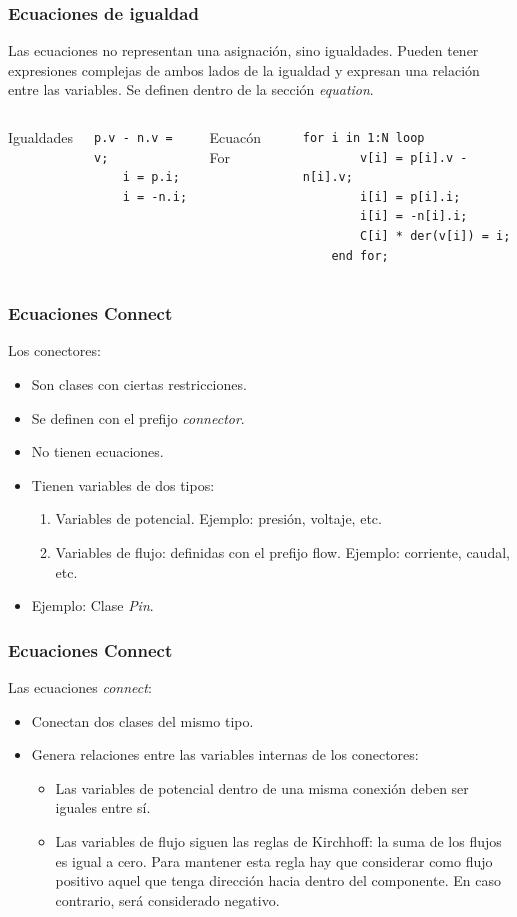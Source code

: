 \documentclass[aspectratio=169,10pt]{beamer}
\begin{document}
\begin{frame}[fragile]
\frametitle{Ecuaciones de igualdad} 

Las ecuaciones no representan una asignaci\'on, sino igualdades. Pueden tener expresiones complejas de ambos lados de la igualdad y expresan una relaci\'on entre las variables. Se definen dentro de la secci\'on \textit{equation}.

\begin{columns}  
\column[t]{8cm}
Igualdades
\begin{lstlisting}[style=base]
    p.v - n.v = v;
    i = p.i;
    i = -n.i;
\end{lstlisting} 
\column[t]{5cm}
Ecuac\'on For
\begin{lstlisting}[style=base]
    for i in 1:N loop
        v[i] = p[i].v - n[i].v;
        i[i] = p[i].i;
        i[i] = -n[i].i;
        C[i] * der(v[i]) = i;
    end for;
\end{lstlisting} 
\end{columns}


\end{frame}

\begin{frame}[fragile]
\frametitle{Ecuaciones Connect} 
Los conectores:
\begin{itemize}
\item Son clases con ciertas restricciones.
\item Se definen con el prefijo \textit{connector}.
\item No tienen ecuaciones.
\item Tienen variables de dos tipos:
    \begin{enumerate}
        \item Variables de potencial. Ejemplo: presi\'on, voltaje, etc. 
        \item Variables de flujo: definidas con el prefijo flow. Ejemplo: corriente, caudal, etc.
    \end{enumerate}
\item Ejemplo: Clase \textit{Pin}.
\end{itemize}

\end{frame}

\begin{frame}[fragile]
\frametitle{Ecuaciones Connect} 
Las ecuaciones \textit{connect}: 
\begin{itemize}
\item Conectan dos clases del mismo tipo.
\item Genera relaciones entre las variables internas de los conectores:
\begin{itemize}
\item Las variables de potencial dentro de una misma conexi\'on deben ser iguales entre s\'i.
\item Las variables de flujo siguen las reglas de Kirchhoff: la suma de los flujos es igual a cero. Para mantener esta regla hay que considerar como flujo positivo aquel que tenga direcci\'on hacia dentro del componente. En caso contrario, ser\'a considerado negativo. 
\end{itemize}
\end{itemize}
\end{frame}
\end{document}
